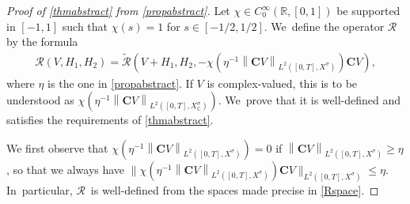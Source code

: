 \documentclass[JEP,XML,SOM,Unicode,published]{cedram}
\newcommand\bnor[2]{\bigl\|#1\bigr\|_{#2}}%
\theoremstyle{definition}
\newcommand{\R}{\mathbb{R}}
\newcommand{\bC}{\boldsymbol{C}}
\newcommand\nor[2]{\left\|#1\right\|_{#2}}
\begin{document}
\begin{proof}[Proof of \cref{thmabstract} from \cref{propabstract}]
Let $\chi\in C^{\infty}_{0}(\R,[0,1])$ be supported in $[-1,1]$ such that $\chi(s)=1$ for $s\in [-1/2,1/2]$. We~define the operator $\mathcal{R}$ by the formula
\begin{align}\label{defR}
\mathcal{R}(V,H_{1},H_{2})=\mathcal{\widetilde{R}}(V+H_{1},H_{2},- \chi(\eta^{-1} \nor{\bC V}{L^{2}([0,T],X^{\sigma})}) \bC V),
\end{align}
where $\eta$ is the one in \cref{propabstract}. If $V$ is complex-valued, this is to be understood as $\chi(\eta^{-1} \nor{\bC V}{L^{2}([0,T],X^{\sigma}_{\mathbb{C}})})$. We~prove that it is well-defined and satisfies the requirements of \cref{thmabstract}.

We first observe that $\chi(\eta^{-1} \nor{\bC V}{L^{2}([0,T],X^{\sigma})}) =0$ if $\nor{ \bC V}{L^{2}([0,T],X^{\sigma})}\geq \eta$, so that we always have $\bnor{ \chi(\eta^{-1} \nor{ \bC V}{L^{2}([0,T],X^{\sigma})}) \bC V}{L^{2}([0,T],X^{\sigma})}\leq \eta$. In~particular, $\mathcal{R}$~is well-defined from the spaces made precise in \eqref{Rspace}.


\end{proof}
\end{document}
